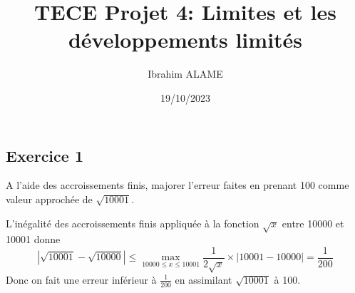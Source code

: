 \documentclass{article}[11pt]
\title{TECE Projet 4: Limites et les développements limités}
\author{Ibrahim ALAME}
\date{19/10/2023}
\begin{document}
\maketitle
\begin{center}
\end{center}
\subsection*{Exercice 1}
{\color{blue}
A l'aide des accroissements finis, majorer l'erreur faites en prenant 100 comme valeur approchée de $\sqrt{10001}$.}

L'inégalité des accroissements finis appliquée à la fonction $\sqrt x$ entre 10000 et 10001 donne
\[|\sqrt{10001}-\sqrt{10000}|\leq \max_{10000\leq x\leq 10001}\frac{1}{2\sqrt x} \times|10001-10000|=\frac{1}{200}\]
Donc on fait une erreur inférieur à $\frac{1}{200}$ en assimilant $\sqrt{10001}$ à 100.
\end{document}
